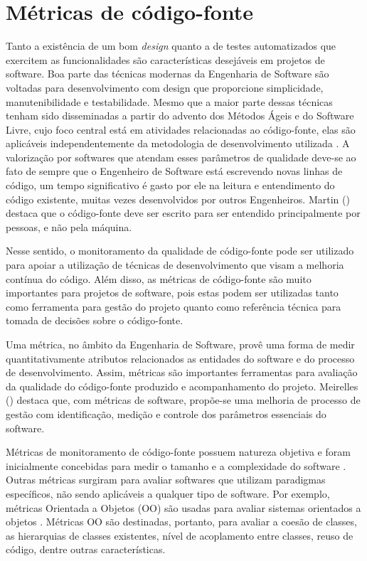 \chapter{Métricas de código-fonte}
\label{cap-metrics-esw} 


Tanto a existência de um bom \emph{design} quanto a de testes automatizados que exercitem as funcionalidades são características desejáveis em projetos de software. Boa parte das técnicas modernas da Engenharia de Software são voltadas para desenvolvimento com design que proporcione simplicidade, manutenibilidade e testabilidade. Mesmo que a maior parte dessas técnicas tenham sido disseminadas a partir do advento dos Métodos Ágeis e do Software Livre, cujo foco central está em atividades relacionadas ao código-fonte, elas são aplicáveis independentemente da metodologia de desenvolvimento utilizada \cite{meirelles2013metrics}. A valorização por softwares que atendam esses parâmetros de qualidade deve-se ao fato de sempre que o Engenheiro de Software está escrevendo novas linhas de código, um tempo significativo é gasto por ele na leitura e entendimento do código existente, muitas vezes desenvolvidos por outros Engenheiros. Martin (\citeyear{martin2008}) destaca que o código-fonte deve ser escrito para ser entendido principalmente por pessoas, e não pela máquina.

%

Nesse sentido, o monitoramento da qualidade de código-fonte pode ser utilizado para apoiar a utilização de técnicas de desenvolvimento que visam a melhoria contínua do código. Além disso, as métricas de código-fonte são muito importantes para projetos de software, pois estas podem ser utilizadas tanto como ferramenta para gestão do projeto quanto como referência técnica para tomada de decisões sobre o código-fonte.

%

Uma métrica, no âmbito da Engenharia de Software, provê uma forma de medir quantitativamente atributos relacionados as entidades do software e do processo de desenvolvimento. Assim, métricas são importantes ferramentas para avaliação da qualidade do código-fonte produzido e acompanhamento do projeto. Meirelles (\citeyear{meirelles2013metrics}) destaca que, com métricas de software, propõe-se uma melhoria de processo de gestão com identificação, medição e controle dos parâmetros essenciais do software.

%

Métricas de monitoramento de código-fonte possuem natureza objetiva e foram inicialmente concebidas para medir o tamanho e a complexidade do software \cite{henry1984kafura}\cite{troy1981zweben}\cite{yau1985zweben}. Outras métricas surgiram para avaliar softwares que utilizam paradigmas específicos, não sendo aplicáveis a qualquer tipo de software. Por exemplo, métricas Orientada a Objetos (OO) são usadas para avaliar sistemas orientados a objetos \cite{systa2000}. Métricas OO são destinadas, portanto, para avaliar a coesão de classes, as hierarquias de classes existentes, nível de acoplamento entre classes, reuso de código, dentre outras características.

